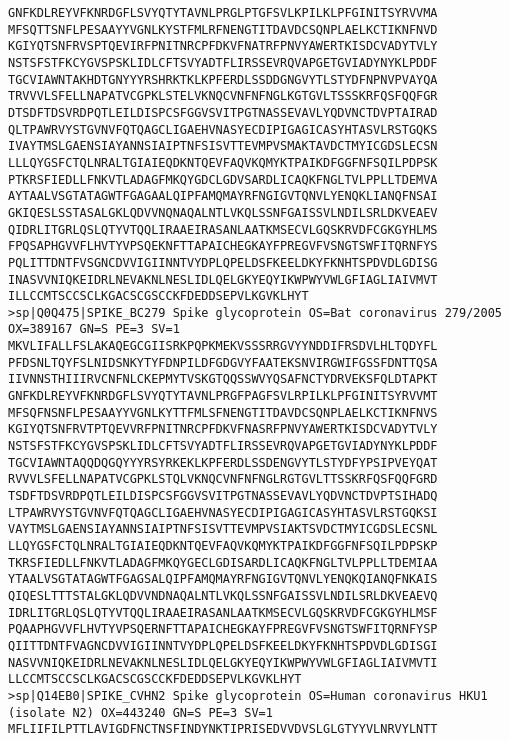 \documentclass[en,black,12pt,normal]{elegantnote}
\begin{document}
\begin{lstlisting}
GNFKDLREYVFKNRDGFLSVYQTYTAVNLPRGLPTGFSVLKPILKLPFGINITSYRVVMA
MFSQTTSNFLPESAAYYVGNLKYSTFMLRFNENGTITDAVDCSQNPLAELKCTIKNFNVD
KGIYQTSNFRVSPTQEVIRFPNITNRCPFDKVFNATRFPNVYAWERTKISDCVADYTVLY
NSTSFSTFKCYGVSPSKLIDLCFTSVYADTFLIRSSEVRQVAPGETGVIADYNYKLPDDF
TGCVIAWNTAKHDTGNYYYRSHRKTKLKPFERDLSSDDGNGVYTLSTYDFNPNVPVAYQA
TRVVVLSFELLNAPATVCGPKLSTELVKNQCVNFNFNGLKGTGVLTSSSKRFQSFQQFGR
DTSDFTDSVRDPQTLEILDISPCSFGGVSVITPGTNASSEVAVLYQDVNCTDVPTAIRAD
QLTPAWRVYSTGVNVFQTQAGCLIGAEHVNASYECDIPIGAGICASYHTASVLRSTGQKS
IVAYTMSLGAENSIAYANNSIAIPTNFSISVTTEVMPVSMAKTAVDCTMYICGDSLECSN
LLLQYGSFCTQLNRALTGIAIEQDKNTQEVFAQVKQMYKTPAIKDFGGFNFSQILPDPSK
PTKRSFIEDLLFNKVTLADAGFMKQYGDCLGDVSARDLICAQKFNGLTVLPPLLTDEMVA
AYTAALVSGTATAGWTFGAGAALQIPFAMQMAYRFNGIGVTQNVLYENQKLIANQFNSAI
GKIQESLSSTASALGKLQDVVNQNAQALNTLVKQLSSNFGAISSVLNDILSRLDKVEAEV
QIDRLITGRLQSLQTYVTQQLIRAAEIRASANLAATKMSECVLGQSKRVDFCGKGYHLMS
FPQSAPHGVVFLHVTYVPSQEKNFTTAPAICHEGKAYFPREGVFVSNGTSWFITQRNFYS
PQLITTDNTFVSGNCDVVIGIINNTVYDPLQPELDSFKEELDKYFKNHTSPDVDLGDISG
INASVVNIQKEIDRLNEVAKNLNESLIDLQELGKYEQYIKWPWYVWLGFIAGLIAIVMVT
ILLCCMTSCCSCLKGACSCGSCCKFDEDDSEPVLKGVKLHYT
>sp|Q0Q475|SPIKE_BC279 Spike glycoprotein OS=Bat coronavirus 279/2005 OX=389167 GN=S PE=3 SV=1
MKVLIFALLFSLAKAQEGCGIISRKPQPKMEKVSSSRRGVYYNDDIFRSDVLHLTQDYFL
PFDSNLTQYFSLNIDSNKYTYFDNPILDFGDGVYFAATEKSNVIRGWIFGSSFDNTTQSA
IIVNNSTHIIIRVCNFNLCKEPMYTVSKGTQQSSWVYQSAFNCTYDRVEKSFQLDTAPKT
GNFKDLREYVFKNRDGFLSVYQTYTAVNLPRGFPAGFSVLRPILKLPFGINITSYRVVMT
MFSQFNSNFLPESAAYYVGNLKYTTFMLSFNENGTITDAVDCSQNPLAELKCTIKNFNVS
KGIYQTSNFRVTPTQEVVRFPNITNRCPFDKVFNASRFPNVYAWERTKISDCVADYTVLY
NSTSFSTFKCYGVSPSKLIDLCFTSVYADTFLIRSSEVRQVAPGETGVIADYNYKLPDDF
TGCVIAWNTAQQDQGQYYYRSYRKEKLKPFERDLSSDENGVYTLSTYDFYPSIPVEYQAT
RVVVLSFELLNAPATVCGPKLSTQLVKNQCVNFNFNGLRGTGVLTTSSKRFQSFQQFGRD
TSDFTDSVRDPQTLEILDISPCSFGGVSVITPGTNASSEVAVLYQDVNCTDVPTSIHADQ
LTPAWRVYSTGVNVFQTQAGCLIGAEHVNASYECDIPIGAGICASYHTASVLRSTGQKSI
VAYTMSLGAENSIAYANNSIAIPTNFSISVTTEVMPVSIAKTSVDCTMYICGDSLECSNL
LLQYGSFCTQLNRALTGIAIEQDKNTQEVFAQVKQMYKTPAIKDFGGFNFSQILPDPSKP
TKRSFIEDLLFNKVTLADAGFMKQYGECLGDISARDLICAQKFNGLTVLPPLLTDEMIAA
YTAALVSGTATAGWTFGAGSALQIPFAMQMAYRFNGIGVTQNVLYENQKQIANQFNKAIS
QIQESLTTTSTALGKLQDVVNDNAQALNTLVKQLSSNFGAISSVLNDILSRLDKVEAEVQ
IDRLITGRLQSLQTYVTQQLIRAAEIRASANLAATKMSECVLGQSKRVDFCGKGYHLMSF
PQAAPHGVVFLHVTYVPSQERNFTTAPAICHEGKAYFPREGVFVSNGTSWFITQRNFYSP
QIITTDNTFVAGNCDVVIGIINNTVYDPLQPELDSFKEELDKYFKNHTSPDVDLGDISGI
NASVVNIQKEIDRLNEVAKNLNESLIDLQELGKYEQYIKWPWYVWLGFIAGLIAIVMVTI
LLCCMTSCCSCLKGACSCGSCCKFDEDDSEPVLKGVKLHYT
>sp|Q14EB0|SPIKE_CVHN2 Spike glycoprotein OS=Human coronavirus HKU1 (isolate N2) OX=443240 GN=S PE=3 SV=1
MFLIIFILPTTLAVIGDFNCTNSFINDYNKTIPRISEDVVDVSLGLGTYYVLNRVYLNTT

\end{lstlisting}
\end{document}
